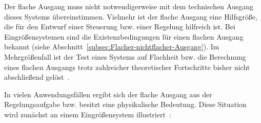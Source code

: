 Der flache Ausgang muss nicht notwendigerweise mit dem technischen
Ausgang dieses Systems übereinstimmen. Vielmehr ist der flache Ausgang
eine Hilfsgröße, die für den Entwurf einer Steuerung bzw. einer Regelung
hilfreich ist. Bei Eingrößensystemen sind die Existenzbedingungen
für einen flachen Ausgang bekannt (siehe Abschnitt~\ref{subsec:Flacher-nichtflacher-Ausgang}).
Im Mehrgrößenfall ist der Test eines Systems auf Flachheit bzw. die
Berechnung eines flachen Ausgangs trotz zahlreicher theoretischer
Fortschritte bisher nicht abschließend gelöst~\cite{levine2011,schoeberl2012at,verhoeven2013,franke2014diss,fritzsche2016at}. 

In vielen Anwendungsfällen ergibt sich der flache Ausgang aus der
Regelungsaufgabe bzw. besitzt eine physikalische Bedeutung. Diese
Situation wird zunächst an einem Eingrößensystem illustriert~\cite{sira-ramirez2002converter,gensior2006}:

